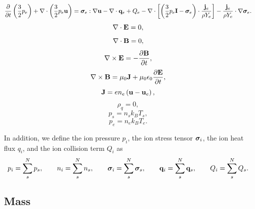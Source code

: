 \documentclass[a4paper,11pt]{report}
\begin{document}
\begin{equation*}
    \frac{\partial}{\partial t} \left( \frac{3}{2} p_e \right) + \nabla \cdot \left( \frac{3}{2} p_e \mathbf{u} \right) = \bm \sigma_e : \nabla \mathbf{u} - \nabla \cdot \mathbf{q}_e + Q_e - \nabla \cdot \left[ \left( \frac{3}{2} p_e \mathbf{I} - \bm \sigma_e \right) \cdot \frac{\mathbf{j}_e}{\rho Y_e}  \right] - \frac{\mathbf{j}_e}{\rho Y_e} \cdot \nabla \bm \sigma_e.
\end{equation*}
\begin{equation*}
    \nabla \cdot \mathbf{E} = 0,
\end{equation*}
\begin{equation*}
    \nabla \cdot \mathbf{B} = 0,
\end{equation*}
\begin{equation*}
    \nabla \times \mathbf{E} = -\frac{ \partial \mathbf{B}}{\partial t},
\end{equation*}
\begin{equation*}
    \nabla \times \mathbf{B} = \mu_0 \mathbf{J} + \mu_0 \epsilon_0 \frac{\partial \mathbf{E}}{\partial t},
\end{equation*}
\begin{equation*}
    \mathbf{J} = e n_e \left(\mathbf{u} - \mathbf{u}_e \right),
\end{equation*}
\begin{equation*}
    \rho_q = 0,
\end{equation*}
\begin{equation*}
    p_s = n_s k_B T_s,
\end{equation*}
\begin{equation*}
    p_e = n_e k_B T_e.
\end{equation*}

In addition, we define the ion pressure $p_i$, the ion stress tensor $\bm \sigma_i$, the ion heat flux $q_i$, and the ion collision term $Q_i$ as
\begin{equation*}
    p_i = \sum_s^N p_s,
\qquad
    n_i = \sum_s^N n_s,
\qquad
    \bm \sigma_i = \sum_s^N \bm \sigma_s,
\qquad
    \mathbf{q}_i = \sum_s^N \mathbf{q}_s,
\qquad
    Q_i = \sum_s^N Q_s.
\end{equation*}

\subsection{Mass}
\end{document}
